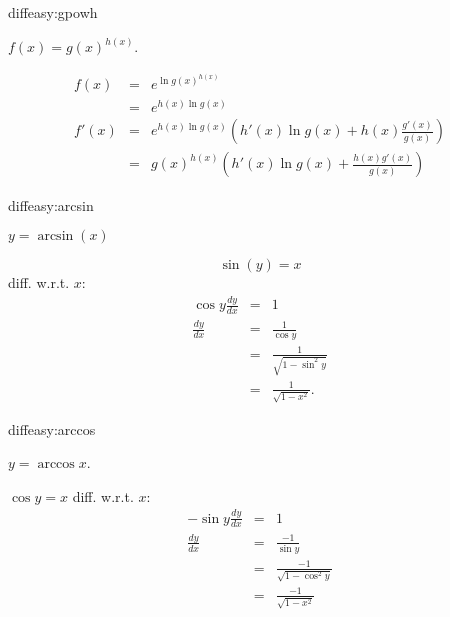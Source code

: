
\begin{defproblem}{diffeasy:gpowh}%
\begin{onlyproblem}%
\(f(x) = g(x)^{h(x)}.\)%
\end{onlyproblem}%
\begin{onlysolution}%
\begin{eqnarray*}
f(x) & = & e^{\ln g(x)^{h(x)}}\\
 & = & e^{h(x)\ln g(x)}\\
f'(x) & = & e^{h(x)\ln g(x)}(h'(x)\ln g(x) + h(x)\frac{g'(x)}{g(x)})\\
 & = & g(x)^{h(x)}(h'(x)\ln g(x) + \frac{h(x)g'(x)}{g(x)})
\end{eqnarray*}%
\end{onlysolution}%
\end{defproblem}

\begin{defproblem}{diffeasy:arcsin}%
\begin{onlyproblem}%
\(y = \arcsin(x)\)%
\end{onlyproblem}%
\begin{onlysolution}%
\[\sin(y) = x\]
diff. w.r.t. $x$:
\begin{eqnarray*}
\cos y \frac{dy}{dx} & = & 1\\
\frac{dy}{dx} & = & \frac{1}{\cos y}\\
 & = & \frac{1}{\sqrt{1 - \sin^2y}}\\
 & = & \frac{1}{\sqrt{1-x^2}}.
\end{eqnarray*}
\end{onlysolution}%
\end{defproblem}

\begin{defproblem}{diffeasy:arccos}%
\begin{onlyproblem}%
$y = \arccos x$.%
\end{onlyproblem}%
\begin{onlysolution}%
\(\cos y = x\)
diff. w.r.t. $x$:
\begin{eqnarray*}
-\sin y \frac{dy}{dx} & = & 1\\
\frac{dy}{dx} & = & \frac{-1}{\sin y}\\
 & = & \frac{-1}{\sqrt{1-\cos^2y}}\\
 & = & \frac{-1}{\sqrt{1-x^2}}
\end{eqnarray*}
\end{onlysolution}%
\end{defproblem}

